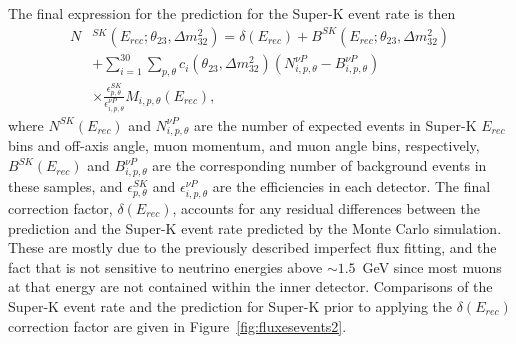 The final expression for the \nuprismlite prediction for the Super-K event rate is then
\begin{equation}
\begin{split}
N&^{SK} \left(E_{rec};\theta_{23},\Delta m^2_{32}\right)= \delta\left(E_{rec}\right)+B^{SK}\left(E_{rec};\theta_{23},\Delta m^2_{32}\right) \\
& +\sum_{i=1}^{30}\sum_{p,\theta}c_i\left(\theta_{23},\Delta m^2_{32}\right)\left(N^{\nu P}_{i,p,\theta}-B^{\nu P}_{i,p,\theta}\right) \\
& \times\frac{\epsilon^{SK}_{p,\theta}}{\epsilon^{\nu P}_{i,p,\theta}}M_{i,p,\theta}\left(E_{rec}\right),
\end{split}
\end{equation}
where $N^{SK}\left(E_{rec}\right)$ and $N^{\nu P}_{i,p,\theta}$ are the number of expected events in Super-K $E_{rec}$ bins and \nuprismlite off-axis angle, muon momentum, and muon angle bins, respectively, $B^{SK}\left(E_{rec}\right)$ and $B^{\nu P}_{i,p,\theta}$ are the corresponding number of background events in these samples, and $\epsilon^{SK}_{p,\theta}$ and $\epsilon^{\nu P}_{i,p,\theta}$ are the efficiencies in each detector. The final correction factor, $\delta\left(E_{rec}\right)$, accounts for any residual differences between the \nuprismlite prediction and the Super-K event rate predicted by the Monte Carlo simulation. These are mostly due to the previously described imperfect flux fitting, and the fact that \nuprismlite is not sensitive to neutrino energies above $\sim 1.5$~GeV since most muons at that energy are not contained within the inner detector.
Comparisons of the Super-K event rate and the \nuprismlite prediction for Super-K prior to applying the $\delta\left(E_{rec}\right)$ correction factor are given in Figure~\ref{fig:fluxesevents2}.


